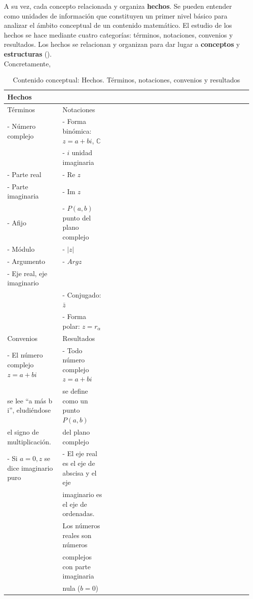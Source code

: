 \documentclass[../main.tex]{memoir}
\begin{document}
A su vez, cada concepto relacionada y organiza \textbf{hechos}. Se pueden entender como unidades de información que constituyen un primer nivel básico para analizar el ámbito conceptual de un contenido matemático. El estudio de los hechos se hace mediante cuatro categorías: términos, notaciones, convenios y resultados. Los hechos se relacionan y organizan para dar lugar a \textbf{conceptos} y \textbf{estructuras} (\cite{rico2016}). \\



Concretamente,

\begin{table}[H]
	\centering
	\begin{tabular}{llccccccccccccccccccccc}
		\toprule
		\hspace{5.8cm}\textbf{Hechos} \\
		\midrule
		Términos & Notaciones \\
		\midrule
		- Número complejo & - Forma binómica: $z = a +bi$, $\mathbb{C}$ \\
		& - $i$ unidad imaginaria \\
		- Parte real & - Re $z$ \\
		- Parte imaginaria & - Im $z$ \\
		- Afijo & - $P(a,b)$ punto del plano complejo\\
		- Módulo & - $|z|$ \\
		- Argumento & - $Arg z$ \\
		- Eje real, eje imaginario & \\
		 & - Conjugado: $\bar{z}$ \\
		 & - Forma polar: $z = r_\alpha$ \\
		\midrule
		Convenios & Resultados \\
		\midrule
		- El número complejo $z = a +bi$  & - Todo número complejo $z = a +bi$ \\
		se lee ``a más b i'', eludiéndose & se define como un punto $P(a,b)$  \\
		el signo de multiplicación. & del plano complejo  \\
		- Si $a=0, z$ se dice imaginario puro & - El eje real es el eje de abscisa y el eje \\
		&  imaginario es el eje de ordenadas. \\
		& Los números reales son números  \\
		& complejos con parte imaginaria  \\
		& nula ($b=0$) \\
		\bottomrule
	\end{tabular}
	\caption{Contenido conceptual: Hechos. Términos, notaciones, convenios y resultados}
	\label{tab:terminos-notaciones}
\end{table}
\end{document}
